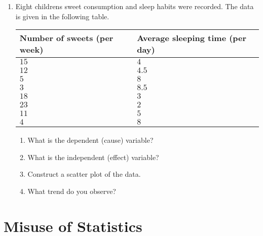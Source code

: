 {\begin{enumerate}
	\begin{enumerate}
	\item Construct a scatter plot and explain how you chose the dependent (cause) and independent (effect) variables.
	\item What pattern or trend do you observe?
	\end{enumerate}
\item Eight childrens sweet consumption and sleep habits were recorded. The data is given in the following table.

\begin{center}
\begin{tabular}{|l|l|}
\hline
Number of sweets (per week) & Average sleeping time (per day) \\ 
\hline
$15$ & $4   $\\
$12$ & $4.5 $\\
$5 $ & $8   $\\
$3 $ & $8.5$ \\
$18$ & $3 $  \\
$23$ & $2$   \\
$11$ & $5$   \\
$4$  & $8$   \\
\hline
\end{tabular}
\end{center}

	\begin{enumerate}
	\item What is the dependent (cause) variable? 
	\item What is the independent (effect) variable?
	\item Construct a scatter plot of the data.
	\item What trend do you observe?
	\end{enumerate}
\end{enumerate}
}

\section{Misuse of Statistics}

